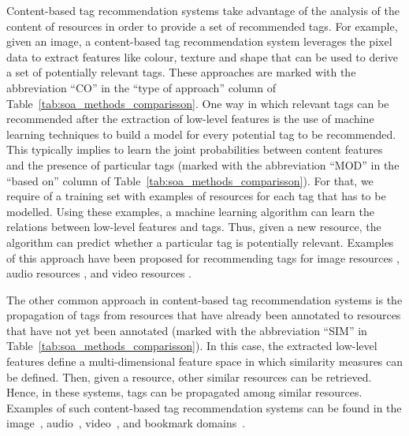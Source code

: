 Content-based tag recommendation systems take advantage of the analysis of the content of resources in order to provide a set of recommended tags.
For example, given an image, a content-based tag recommendation system leverages the pixel data to extract features like colour, texture and shape that can be used to derive a set of potentially relevant tags.
These approaches are marked with the abbreviation ``CO'' in the ``type of approach'' column of Table~\ref{tab:soa_methods_comparisson}.
One way in which relevant tags can be recommended after the extraction of low-level features is the use of machine learning techniques to build a model for every potential tag to be recommended. This typically implies to learn the joint probabilities between content features and the presence of particular tags (marked with the abbreviation ``MOD'' in the ``based on'' column of Table~\ref{tab:soa_methods_comparisson}). 
For that, we require of a training set with examples of resources for each tag that has to be modelled. Using these examples, a machine learning algorithm can learn the relations between low-level features and tags. Thus, given a new resource, the algorithm can predict whether a particular tag is potentially relevant. Examples of this approach have been proposed for recommending tags for image resources \citep{Barnard2003,Li2006,Anderson2008,Chen2008a,Wu2009}, audio resources \citep{barrington2007,turnbull2008}, and video resources \citep{Toderici2010}. 

The other common approach in content-based tag recommendation systems is the propagation of tags from resources that have already been annotated to resources that have not yet been annotated (marked with the abbreviation ``SIM'' in Table~\ref{tab:soa_methods_comparisson}). In this case, the extracted low-level features define a multi-dimensional feature space in which similarity measures can be defined. Then, given a resource, other similar resources can be retrieved. Hence, in these systems, tags can be propagated among similar resources. Examples of such content-based tag recommendation systems can be found in the image~\citep{Liu2010a,ivanov2010,Lee2010,Sevil2010a}, audio~\citep{martinez2009,moha2012}, video~\citep{Ballan2010}, and bookmark domains~\citep{Zhang2009,Lops2012}.

